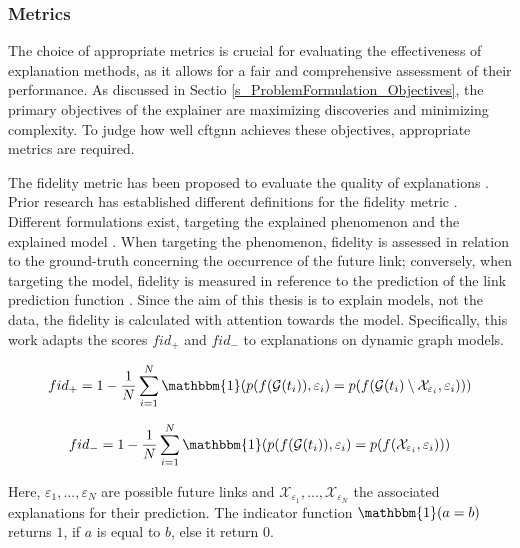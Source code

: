 \subsubsection{Metrics} 
\label{s_Evaluation_Setup_Metrics}
The choice of appropriate metrics is crucial for evaluating the effectiveness of explanation methods, as it allows for a fair and comprehensive assessment of their performance. As discussed in Sectio \ref{s_ProblemFormulation_Objectives}, the primary objectives of the explainer are maximizing discoveries and minimizing complexity. To judge how well \gls{cftgnn} achieves these objectives, appropriate metrics are required.

The fidelity metric has been proposed to evaluate the quality of explanations \cite{amara_graphframex_2022}. Prior research has established different definitions for the fidelity metric \cite{yuan_explainability_2020, lucic_cf-gnnexplainer_2022, xia_explaining_2023, amara_graphframex_2022, prado-romero_survey_2023}. Different formulations exist, targeting the explained phenomenon and the explained model \cite{amara_graphframex_2022}. When targeting the phenomenon, fidelity is assessed in relation to the ground-truth concerning the occurrence of the future link; conversely, when targeting the model, fidelity is measured in reference to the prediction of the link prediction function \cite{amara_graphframex_2022}. Since the aim of this thesis is to explain models, not the data, the fidelity is calculated with attention towards the model. Specifically, this work adapts the scores $fid_+$ and $fid_-$ \cite{amara_graphframex_2022, yuan_explainability_2020} to explanations on dynamic graph models.

\begin{equation}
    fid_+ = 1 - \frac{1}{N} \sum_{i = 1}^N \mathbbm{1}(p(f(\mathcal{G}(t_i)), \varepsilon_i) = p(f(\mathcal{G}(t_i) \setminus \mathcal{X}_{\varepsilon_i}, \varepsilon_i))) 
\end{equation}

\begin{equation}
    fid_- = 1 - \frac{1}{N} \sum_{i = 1}^N \mathbbm{1}(p(f(\mathcal{G}(t_i)), \varepsilon_i) = p(f(\mathcal{X}_{\varepsilon_i}, \varepsilon_i)))
\end{equation}

Here, $\varepsilon_1, ..., \varepsilon_N$ are possible future links and $\mathcal{X}_{\varepsilon_1},...,\mathcal{X}_{\varepsilon_N}$ the associated explanations for their prediction. The indicator function $\mathbbm{1}(a = b)$ returns $1$, if $a$ is equal to $b$, else it return $0$.

